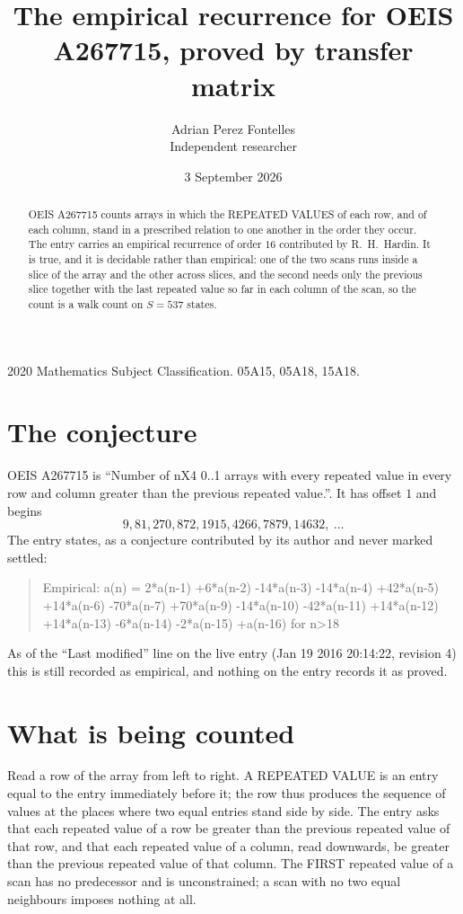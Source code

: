 \documentclass[11pt,a4paper]{article}
\title{The empirical recurrence for OEIS A267715, proved by transfer matrix}
\author{Adrian Perez Fontelles\\ \small Independent researcher}
\date{3 September 2026}
\theoremstyle{plain}
\theoremstyle{definition}
\begin{document}
\maketitle

\begin{abstract}
OEIS A267715 counts arrays in which the REPEATED VALUES of each row, and of each column, stand in a
prescribed relation to one another in the order they occur. The entry carries an empirical
recurrence of order $16$ contributed by R.~H.~Hardin. It is true, and it is decidable
rather than empirical: one of the two scans runs inside a slice of the array and the other
across slices, and the second needs only the previous slice together with the last repeated
value so far in each column of the scan, so the count is a walk count on $S=537$ states.
\end{abstract}

\noindent\small 2020 Mathematics Subject Classification. 05A15, 05A18, 15A18.\normalsize

\section{The conjecture}

OEIS A267715 is ``Number of nX4 0..1 arrays with every repeated value in every row and column greater than the previous repeated value.''. It has offset $1$ and begins
\[
9, 81, 270, 872, 1915, 4266, 7879, 14632,\ \dots
\]
The entry states, as a conjecture contributed by its author and never marked settled:
\begin{quote}
Empirical: a(n) = 2*a(n-1) +6*a(n-2) -14*a(n-3) -14*a(n-4) +42*a(n-5) +14*a(n-6) -70*a(n-7) +70*a(n-9) -14*a(n-10) -42*a(n-11) +14*a(n-12) +14*a(n-13) -6*a(n-14) -2*a(n-15) +a(n-16) for n>18
\end{quote}
As of the ``Last modified'' line on the live entry (Jan 19 2016 20:14:22, revision 4) this is still
recorded as empirical, and nothing on the entry records it as proved.

\section{What is being counted}

Read a row of the array from left to right. A REPEATED VALUE is an entry equal to the entry
immediately before it; the row thus produces the sequence of values at the places where two
equal entries stand side by side. The entry asks that each repeated value of a row be
greater than the previous repeated value of that row, and that each repeated value of a column,
read downwards, be greater than the previous repeated value of that column. The FIRST repeated
value of a scan has no predecessor and is unconstrained; a scan with no two equal neighbours
imposes nothing at all.
\end{document}

